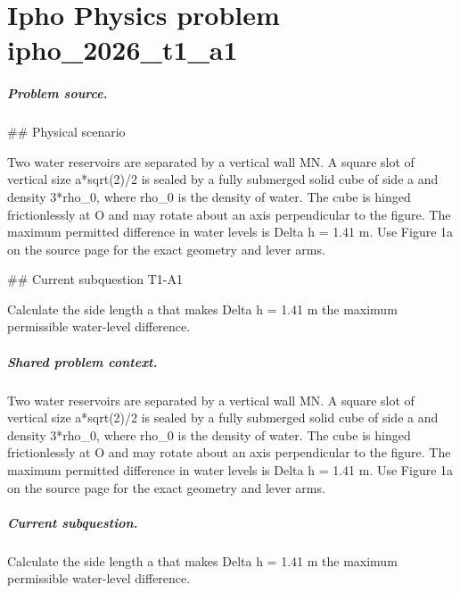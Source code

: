 
\chapter{Ipho Physics problem ipho\_2026\_t1\_a1}
\label{ch:IPhO2026Problems_problem_ipho_2026_t1_a1}

\paragraph{Problem source.}
\#\# Physical scenario

Two water reservoirs are separated by a vertical wall MN.  A square slot of
vertical size a*sqrt(2)/2 is sealed by a fully submerged solid cube of side a
and density 3*rho\_0, where rho\_0 is the density of water.  The cube is hinged
frictionlessly at O and may rotate about an axis perpendicular to the figure.
The maximum permitted difference in water levels is Delta h = 1.41 m.  Use
Figure 1a on the source page for the exact geometry and lever arms.

\#\# Current subquestion T1-A1

Calculate the side length a that makes Delta h = 1.41 m the maximum permissible water-level difference.

\paragraph{Shared problem context.}
Two water reservoirs are separated by a vertical wall MN.  A square slot of
vertical size a*sqrt(2)/2 is sealed by a fully submerged solid cube of side a
and density 3*rho\_0, where rho\_0 is the density of water.  The cube is hinged
frictionlessly at O and may rotate about an axis perpendicular to the figure.
The maximum permitted difference in water levels is Delta h = 1.41 m.  Use
Figure 1a on the source page for the exact geometry and lever arms.

\paragraph{Current subquestion.}
Calculate the side length a that makes Delta h = 1.41 m the maximum permissible water-level difference.

